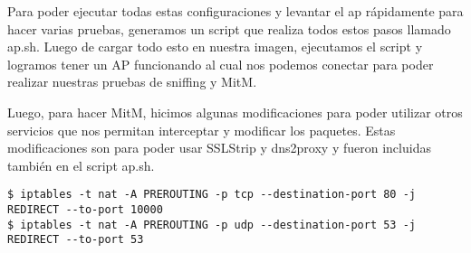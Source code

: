 Para poder ejecutar todas estas configuraciones y levantar el ap rápidamente para hacer varias pruebas, generamos un script que realiza todos estos pasos 
llamado ap.sh. Luego de cargar todo esto en nuestra imagen, ejecutamos el script y logramos tener un AP funcionando al cual nos podemos conectar para poder
realizar nuestras pruebas de sniffing y MitM.

Luego, para hacer MitM, hicimos algunas modificaciones para poder utilizar otros servicios que nos permitan interceptar y modificar los paquetes. Estas modificaciones 
son para poder usar SSLStrip y dns2proxy y fueron incluidas también en el script ap.sh.

\begin{lstlisting}[style=base]
$ iptables -t nat -A PREROUTING -p tcp --destination-port 80 -j REDIRECT --to-port 10000
$ iptables -t nat -A PREROUTING -p udp --destination-port 53 -j REDIRECT --to-port 53	
\end{lstlisting}
